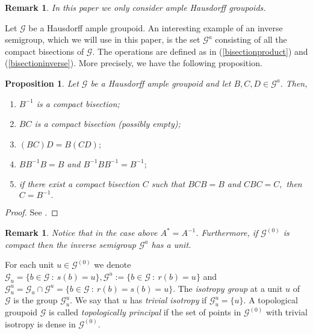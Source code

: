 \documentclass[11pt, a4paper]{amsart}
\newcommand{\G}{\ensuremath {\mathcal{G}}}
\newcommand{\Go}{\ensuremath {\mathcal{G}^{(0)}}}
\newcommand{\Ga}{\ensuremath {\mathcal{G}^{a}}}
\theoremstyle{plain}
\newtheorem{prop}[theorem]{Proposition}
\newtheorem{remark}[theorem]{Remark}
\begin{document}
\begin{remark}
In this paper we only consider ample Hausdorff groupoids.
\end{remark} 

Let $\G$ be a Hausdorff ample groupoid.  An interesting example of an inverse semigroup, which we will use in this paper, is the set $\Ga$ consisting of all the compact bisections of $\G.$ The operations are defined as in (\ref{bisectionproduct}) and (\ref{bisectioninverse}). More precisely, we have the following proposition. 

\begin{prop}\label{bisectsetsemigroup}
Let $\G$  be a Hausdorff ample groupoid and let $ B, C, D \in \Ga.$ Then, 
\begin{enumerate}[{\rm (i)}]
\item $B^{-1}$ is a compact bisection;
\item $BC$ is a compact bisection (possibly empty);
\item $(BC)D=B(CD);$ 
\item $BB^{-1}B=B$ and $B^{-1}BB^{-1}=B^{-1};$
\item if there exist a compact bisection $C$ such that  $BCB=B$ and $CBC=C,$ then $C=B^{-1}.$
\end{enumerate} 
\end{prop}

\begin{proof} 
See \cite[Proposition~2.2.3]{Paterson}.
\end{proof}

\begin{remark} Notice that in the case above $A^*=A^{-1}$. Furthermore, if $\Go$ is compact then the inverse semigroup $\Ga$ has a unit.   
\end{remark}

For each unit $u \in \Go$ we denote $\G_u = \{ b \in \G \ : \ s(b)=u\}, \G^u:= \{ b \in \G \ : \ r(b)=u \}$ and $\G_u^u =\G_u \cap \G^u =\{b \in \G \ : \ r(b)=s(b)=u \}.$  The \emph{isotropy group} at a unit $u$ of $\G$ is the group $\G_u^u$. We say that $u$ has \emph{trivial isotropy} if $\G_u^u= \{u\}.$ A topological groupoid $\G$ is called \emph{topologically principal} if the set of points in $\Go$ with trivial isotropy is dense in $\Go.$


\end{document}
